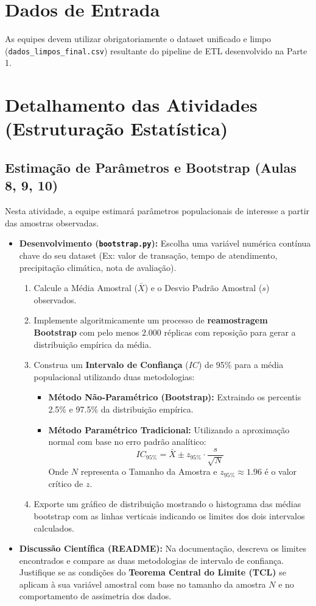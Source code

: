 \documentclass[12pt,a4paper]{article}
\begin{document}
	\section{Dados de Entrada}
	As equipes devem utilizar obrigatoriamente o dataset unificado e limpo (\texttt{dados\_limpos\_final.csv}) resultante do pipeline de ETL desenvolvido na Parte 1.
	
	\section{Detalhamento das Atividades (Estruturação Estatística)}
	
	\subsection{Estimação de Parâmetros e Bootstrap (Aulas 8, 9, 10)}
	Nesta atividade, a equipe estimará parâmetros populacionais de interesse a partir das amostras observadas.
	\begin{itemize}
		\item \textbf{Desenvolvimento (\texttt{bootstrap.py}):} Escolha uma variável numérica contínua chave do seu dataset (Ex: valor de transação, tempo de atendimento, precipitação climática, nota de avaliação).
		\begin{enumerate}
			\item Calcule a Média Amostral ($\bar{X}$) e o Desvio Padrão Amostral ($s$) observados.
			\item Implemente algoritmicamente um processo de \textbf{reamostragem Bootstrap} com pelo menos $2.000$ réplicas com reposição para gerar a distribuição empírica da média.
			\item Construa um \textbf{Intervalo de Confiança} ($IC$) de 95\% para a média populacional utilizando duas metodologias:
			\begin{itemize}
				\item \textbf{Método Não-Paramétrico (Bootstrap):} Extraindo os percentis 2.5\% e 97.5\% da distribuição empírica.
				\item \textbf{Método Paramétrico Tradicional:} Utilizando a aproximação normal com base no erro padrão analítico:
				$$IC_{95\%} = \bar{X} \pm z_{95\%} \cdot \frac{s}{\sqrt{N}}$$
				Onde $N$ representa o Tamanho da Amostra e $z_{95\%} \approx 1.96$ é o valor crítico de $z$.
			\end{itemize}
			\item Exporte um gráfico de distribuição mostrando o histograma das médias bootstrap com as linhas verticais indicando os limites dos dois intervalos calculados.
		\end{enumerate}
		\item \textbf{Discussão Científica (README):} Na documentação, descreva os limites encontrados e compare as duas metodologias de intervalo de confiança. Justifique se as condições do \textbf{Teorema Central do Limite (TCL)} se aplicam à sua variável amostral com base no tamanho da amostra $N$ e no comportamento de assimetria dos dados.
	\end{itemize}
	
\end{document}
